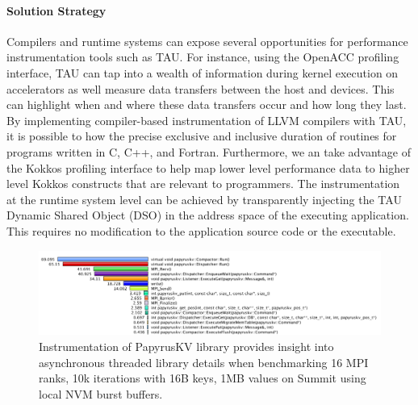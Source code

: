\paragraph{Solution Strategy} Compilers and runtime systems can expose several opportunities for performance instrumentation tools such as TAU.  For instance, using the OpenACC profiling interface, TAU can tap into a wealth of information during kernel execution on accelerators as well measure data transfers between the host and devices. This can highlight when and where these data transfers occur and how long they last.  By implementing compiler-based instrumentation of LLVM compilers with TAU, it is possible to how the precise exclusive and inclusive duration of routines for programs written in C, C++, and Fortran.  Furthermore, we an take advantage of the Kokkos profiling interface to help map lower level performance data to higher level Kokkos constructs that are relevant to programmers. The instrumentation at the runtime system level can be achieved by transparently injecting the TAU Dynamic Shared Object (DSO) in the address space of the executing application. This requires no modification to the application source code or the executable. 
\begin{figure}[htb]
\centering
\includegraphics[width=6in]{projects/2.3.2-Tools/2.3.2.10-PROTEAS-YTUNE/tau-papyruskv}
\caption{
  Instrumentation of PapyrusKV library provides insight into asynchronous threaded library details when benchmarking 16 MPI ranks, 10k iterations with 16B keys, 1MB values on Summit using local NVM burst buffers.}
\label{figure:tau}
\end{figure}

